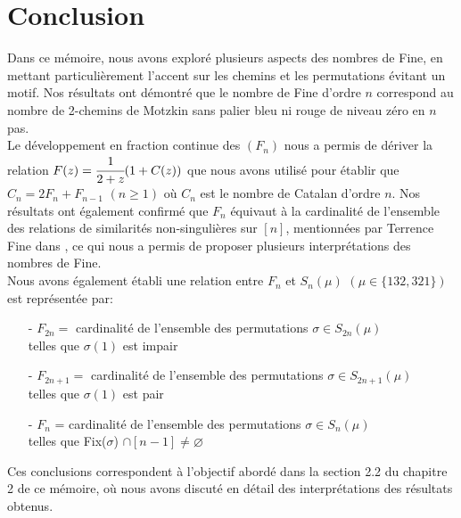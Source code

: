 \begingroup
\renewcommand{\thechapter}{}
\chapter{Conclusion}
\endgroup
Dans ce mémoire, nous avons exploré plusieurs aspects des nombres de Fine, en mettant particulièrement l'accent sur les chemins et les permutations évitant un motif. Nos résultats ont démontré que le nombre de Fine d'ordre $n$ correspond au  nombre de 2-chemins de Motzkin sans palier bleu ni rouge de niveau zéro en $n$ pas.\\

Le développement en fraction continue des $(F_{n})$ nous a permis de dériver la relation $F(z) = \cfrac{1}{2+z}(1+C(z))$ que nous avons utilisé pour établir que $C_{n} = 2F_{n} + F_{n-1}$ $(n\geq 1)$ où $C_{n}$ est le nombre de Catalan d'ordre $n$.  Nos résultats ont également confirmé que $F_{n}$ équivaut à la cardinalité de l'ensemble des relations de similarités non-singulières sur $[n]$, mentionnées par Terrence Fine dans \cite{TFine}, ce qui nous a permis de proposer plusieurs interprétations des nombres de Fine.\\

Nous avons également établi une relation entre $F_{n}$ et $S_{n}(\mu)$ $(\mu \in \{132, 321\})$ est représentée par:
\begin{itemize}
    \item[-] $F_{2n}=$ cardinalité de l'ensemble des permutations $\sigma \in S_{2n}(\mu)$ \\telles que $\sigma(1)$ est impair 
    \item[-] $F_{2n+1}=$ cardinalité de l'ensemble des permutations $\sigma \in S_{2n+1}(\mu)$ \\telles que $\sigma(1)$ est pair
    \item[-] $F_{n}$ = cardinalité de l'ensemble des permutations $\sigma \in S_{n}(\mu)$ \\telles que Fix($\sigma$) $\cap [n-1]\neq \varnothing$
\end{itemize}
Ces conclusions correspondent à l'objectif abordé dans la section 2.2 du chapitre 2 de ce mémoire, où nous avons discuté en détail des interprétations des résultats obtenus.
